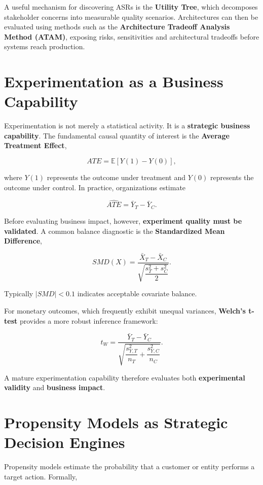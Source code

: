 \documentclass[
  a4paper,
  DIV=11,
  numbers=noendperiod]{scrartcl}
\begin{document}
A useful mechanism for discovering ASRs is the \textbf{Utility Tree},
which decomposes stakeholder concerns into measurable quality scenarios.
Architectures can then be evaluated using methods such as the
\textbf{Architecture Tradeoff Analysis Method (ATAM)}, exposing risks,
sensitivities and architectural tradeoffs before systems reach
production.

\section{Experimentation as a Business
Capability}\label{experimentation-as-a-business-capability}

Experimentation is not merely a statistical activity. It is a
\textbf{strategic business capability}. The fundamental causal quantity
of interest is the \textbf{Average Treatment Effect},

\[
ATE = \mathbb{E}[Y(1) - Y(0)],
\]

where \(Y(1)\) represents the outcome under treatment and \(Y(0)\)
represents the outcome under control. In practice, organizations
estimate

\[
\widehat{ATE} = \bar{Y}_T - \bar{Y}_C.
\]

Before evaluating business impact, however, \textbf{experiment quality
must be validated}. A common balance diagnostic is the
\textbf{Standardized Mean Difference},

\[
SMD(X) = \frac{\bar{X}_T - \bar{X}_C}{\sqrt{\dfrac{s_T^2 + s_C^2}{2}}}.
\]

Typically \(|SMD| < 0.1\) indicates acceptable covariate balance.

For monetary outcomes, which frequently exhibit unequal variances,
\textbf{Welch's t-test} provides a more robust inference framework:

\[
t_W = \frac{\bar{Y}_T - \bar{Y}_C}{\sqrt{\dfrac{s_{Y,T}^2}{n_T}
                                          + \dfrac{s_{Y,C}^2}{n_C}}}.
\]

A mature experimentation capability therefore evaluates both
\textbf{experimental validity} and \textbf{business impact}.

\section{Propensity Models as Strategic Decision
Engines}\label{propensity-models-as-strategic-decision-engines}

Propensity models estimate the probability that a customer or entity
performs a target action. Formally,
\end{document}
